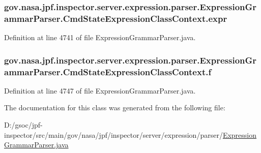 \subsubsection[{\texorpdfstring{expr}{expr}}]{ gov.\+nasa.\+jpf.\+inspector.\+server.\+expression.\+parser.\+Expression\+Grammar\+Parser.\+Cmd\+State\+Expression\+Class\+Context.\+expr}\hypertarget{classgov_1_1nasa_1_1jpf_1_1inspector_1_1server_1_1expression_1_1parser_1_1_expression_grammar_pa672388ef0800b4a3d173ab7548f6b406_a9daec77817c89a340cea43b6ba22180e}{}\label{classgov_1_1nasa_1_1jpf_1_1inspector_1_1server_1_1expression_1_1parser_1_1_expression_grammar_pa672388ef0800b4a3d173ab7548f6b406_a9daec77817c89a340cea43b6ba22180e}


Definition at line 4741 of file Expression\+Grammar\+Parser.\+java.

\subsubsection[{\texorpdfstring{f}{f}}]{ gov.\+nasa.\+jpf.\+inspector.\+server.\+expression.\+parser.\+Expression\+Grammar\+Parser.\+Cmd\+State\+Expression\+Class\+Context.\+f}\hypertarget{classgov_1_1nasa_1_1jpf_1_1inspector_1_1server_1_1expression_1_1parser_1_1_expression_grammar_pa672388ef0800b4a3d173ab7548f6b406_a189dcfe39c0696c6f56a4f10fb23c94c}{}\label{classgov_1_1nasa_1_1jpf_1_1inspector_1_1server_1_1expression_1_1parser_1_1_expression_grammar_pa672388ef0800b4a3d173ab7548f6b406_a189dcfe39c0696c6f56a4f10fb23c94c}


Definition at line 4747 of file Expression\+Grammar\+Parser.\+java.



The documentation for this class was generated from the following file\+:\begin{DoxyCompactItemize}
\item 
D\+:/gsoc/jpf-\/inspector/src/main/gov/nasa/jpf/inspector/server/expression/parser/\hyperlink{_expression_grammar_parser_8java}{Expression\+Grammar\+Parser.\+java}\end{DoxyCompactItemize}
